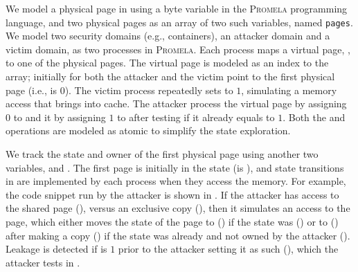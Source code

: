 We model a physical page in  using a byte
variable in the \textsc{Promela} programming language, and two
physical pages as an array of two such variables, named
\texttt{pages}.  We model two security domains (e.g., containers), an
attacker domain and a victim domain, as two processes in
\textsc{Promela}.  Each process maps a virtual page, \mcVirt, to one
of the physical pages. The virtual page is modeled as an index to the
\mcPagesArray{} array; initially \mcVirt for both the attacker and the
victim point to the first physical page (i.e., \mcVirt is $0$).  The
victim process repeatedly sets \mcPages{\mcVirt} to $1$, simulating a
memory access that brings \mcPages{\mcVirt} into cache.  The attacker
process  the virtual page by assigning $0$ to
\mcPages{\mcVirt} and  it by assigning $1$ to
\mcPages{\mcVirt} after testing if it already equals to $1$.  Both the
\Flush and \Reload operations are modeled as atomic to
simplify the state exploration.

We track the state and owner of the first physical page using another
two variables, \mcState and \mcOwner.  The first page is initially in
the \shared state (\mcState is \shared), and state transitions in
 are implemented by each process when they access
the memory.  For example, the \Reload code snippet run by the attacker
is shown in .  If the attacker has access to
the shared page (), versus an
exclusive copy (), then it
simulates an access to the page, which either moves the state of the
page to \accessed () if the state
was \shared () or to \exclusive
() after making a copy
() if the state was already \accessed and
not owned by the attacker ().
Leakage is detected if \mcPages{\mcVirt} is $1$ prior to the
attacker setting it as such (), which
the attacker tests in .

